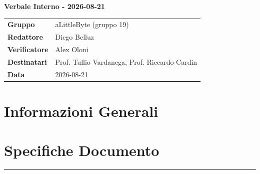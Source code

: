 \documentclass[a4paper,12pt]{article}
\begin{document}
\thispagestyle{firstpage}

\vspace*{0.5cm}

\begin{center}
    {\LARGE \textbf{Verbale Interno - 2026-08-21}}
\end{center}

\vspace{1.5cm}

\begin{center}
    \renewcommand{\arraystretch}{1.3}
    \begin{tcolorbox}[
        width=0.92\textwidth,
        colback=gray!6,
        colframe=gray!45,
        boxrule=0.5pt,
        arc=2mm,
        boxsep=0pt,
        left=8pt, right=8pt, top=8pt, bottom=8pt
    ]
        \begin{tabularx}{\linewidth}{>{\bfseries}p{3.5cm} X}
            Gruppo       & aLittleByte (gruppo 19) \\
            Redattore    & Diego Belluz \\
            Verificatore & Alex Oloni\\
            Destinatari  & Prof. Tullio Vardanega, Prof. Riccardo Cardin \\
            Data         & 2026-08-21\\
        \end{tabularx}
    \end{tcolorbox}
\end{center}

\newpage

\tableofcontents
\newpage
\section{Informazioni Generali}
\section*{Specifiche Documento}
\hrule
\vspace{1cm}
\end{document}
